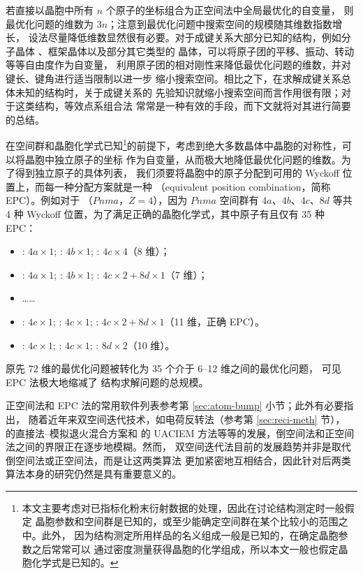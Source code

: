 若直接以晶胞中所有 $n$ 个原子的坐标组合为正空间法中全局最优化的自变量，
则最优化问题的维数为 $3n$；注意到最优化问题中搜索空间的规模随其维数指数增长，
设法尽量降低维数显然很有必要。对于成键关系大部分已知的结构，例如分子晶体%
\parencite{andreev1997}、框架晶体\parencite{falcioni1999}以及部分其它类型的
晶体\parencite{favre2002}，可以将原子团的平移、振动、转动等等自由度作为自变量，
利用原子团的相对刚性来降低最优化问题的维数，并对键长、键角进行适当限制以进一步
缩小搜索空间。相比之下，在求解成键关系总体未知的结构时，关于成键关系的
先验知识就缩小搜索空间而言作用很有限；对于这类结构，等效点系组合法%
\parencite{deng2009}常常是一种有效的手段，而下文就将对其进行简要的总结。

在空间群和晶胞化学式已知\footnote{%
	本文主要考虑对已指标化粉末衍射数据的处理，因此在讨论结构测定时一般假定
	晶胞参数和空间群是已知的，或至少能确定空间群在某个比较小的范围之中。此外，
	因为结构测定所用样品的名义组成一般是已知的，在确定晶胞参数之后常常可以
	通过密度测量获得晶胞的化学组成，所以本文一般也假定晶胞化学式是已知的。%
}的前提下，考虑到绝大多数晶体中晶胞的对称性，可以将晶胞中独立原子的坐标
作为自变量，从而极大地降低最优化问题的维数。为了得到独立原子的具体列表，
我们须要将晶胞中的原子分配到可用的 Wyckoff 位置上，而每一种分配方案就是一种%
（equivalent position combination，简称 EPC）。例如对于
（$Pnma$，$Z = 4$），因为 $Pnma$ 空间群有 $4a$、$4b$、$4c$、$8d$
等共 4 种 Wyckoff 位置，为了满足正确的晶胞化学式，其中原子有且仅有 35 种 EPC：
\vspace{\slop{0.15em}}
\begin{itemize}
	\item {}: $4a\times1$; : $4b\times1$;
		: $4c\times4$（8 维）；
	\item {}: $4a\times1$; : $4b\times1$;
		: $4c\times2 + 8d\times1$（7 维）；
	\item ……
	\item {}: $4c\times1$; : $4c\times1$;
		: $4c\times2 + 8d\times1$（11 维，正确 EPC）。
	\item {}: $4c\times1$; : $4c\times1$;
		: $8d\times2$（10 维）。
\end{itemize}
\vspace{\slop{0.15em}}
原先 72 维的最优化问题被转化为 35 个介于 6--12 维之间的最优化问题，
可见 EPC 法极大地缩减了  结构求解问题的总规模。

正空间法和 EPC 法的常用软件列表参考第 \ref{sec:atom-bump} 小节；此外有必要指出，
随着近年来双空间迭代技术，如电荷反转法（参考第 \ref{sec:reci-meth} 节），%
\textcite{altomare2008b}的直接法{--}模拟退火混合方案和 \textcite{ma2004}的
UACIEM 方法等等的发展，倒空间法和正空间法之间的界限正在逐步地模糊。然而，
双空间迭代法目前的发展趋势并非是取代倒空间法或正空间法，而是让这两类算法
更加紧密地互相结合，因此针对后两类算法本身的研究仍然是具有重要意义的。

